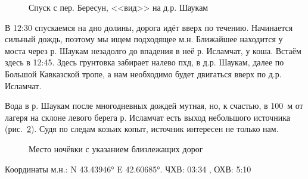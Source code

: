 \begin{figure}[h!]
	\centering
	\caption{Спуск с пер. Бересун, <<вид>> на д.р. Шаукам}
	\label{fig:shaukam}
\end{figure}

В 12:30 спускаемся на дно долины, дорога идёт вверх по течению. Начинается сильный дождь, поэтому мы ищем подходящее м.н. Ближайшее находится у моста через р. Шаукам незадолго до впадения в неё р. Исламчат, у коша. Встаём здесь в 12:45. Здесь грунтовка забирает налево пхд, в д.р. Шаукам, далее по Большой Кавказской тропе, а нам необходимо будет двигаться вверх по д.р. Исламчат.

Вода в р. Шаукам после многодневных дождей мутная, но, к счастью, в 100~м от лагеря на склоне левого берега р. Исламчат есть выход небольшого источника (рис.~\ref{fig:mn910}). Судя по следам козьих копыт, источник интересен не только нам.

\begin{figure}[h!]
	\centering
	\caption{Место ночёвки с указанием близлежащих дорог}
	\label{fig:mn910}
\end{figure}

Координаты м.н.: N 43.43946° E 42.60685°. ЧХВ: 03:34 , ОХВ: 5:10
\clearpage
